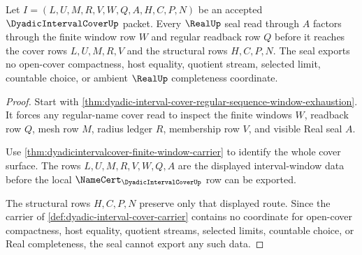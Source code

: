 \begin{theorem}
\label{thm:dyadic-interval-cover-seal-nonescape}
Let $I=(L,U,M,R,V,W,Q,A,H,C,P,N)$ be an accepted $\DyadicIntervalCoverUp$ packet. Every $\RealUp$ seal read through $A$ factors through the finite window row $W$ and regular readback row $Q$ before it reaches the cover rows $L,U,M,R,V$ and the structural rows $H,C,P,N$. The seal exports no open-cover compactness, host equality, quotient stream, selected limit, countable choice, or ambient $\RealUp$ completeness coordinate.
\end{theorem}
\begin{proof}
Start with \autoref{thm:dyadic-interval-cover-regular-sequence-window-exhaustion}. It forces any regular-name cover read to inspect the finite windows $W$, readback row $Q$, mesh row $M$, radius ledger $R$, membership row $V$, and visible Real seal $A$.

Use \autoref{thm:dyadicintervalcover-finite-window-carrier} to identify the whole cover surface. The rows $L,U,M,R,V,W,Q,A$ are the displayed interval-window data before the local $\NameCert_{\DyadicIntervalCoverUp}$ row can be exported.

The structural rows $H,C,P,N$ preserve only that displayed route. Since the carrier of \autoref{def:dyadic-interval-cover-carrier} contains no coordinate for open-cover compactness, host equality, quotient streams, selected limits, countable choice, or Real completeness, the seal cannot export any such data.
\end{proof}


